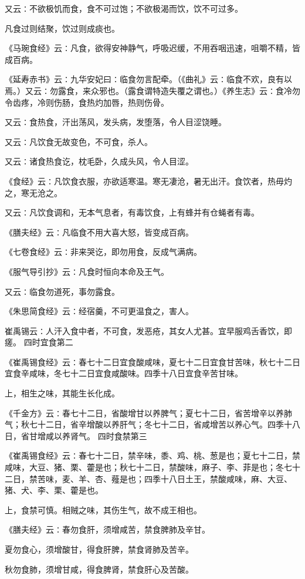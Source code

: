 \documentclass[a4paper,12pt,UTF8,twoside]{ctexbook}
\begin{document}
又云∶不欲极饥而食，食不可过饱；不欲极渴而饮，饮不可过多。

凡食过则结聚，饮过则成痰也。

《马琬食经》云∶凡食，欲得安神静气，呼吸迟缓，不用吞咽迅速，咀嚼不精，皆成百病。

《延寿赤书》云∶九华安妃曰∶临食勿言配牵。（《曲礼》云∶临食不欢，良有以焉。）又云∶勿露食，来众邪也。（露食谓特造失覆之谓也。）《养生志》云∶食冷勿令齿疼，冷则伤肠，食热灼加唇，热则伤骨。

又云∶食热食，汗出荡风，发头病，发堕落，令人目涩饶睡。

又云∶凡饮食无故变色，不可食，杀人。

又云∶诸食热食讫，枕毛卧，久成头风，令人目涩。

《食经》云∶凡饮食衣服，亦欲适寒温。寒无凄沧，暑无出汗。食饮者，热毋灼之，寒无沧之。

又云∶凡饮食调和，无本气息者，有毒饮食，上有蜂并有仓蝇者有毒。

《膳夫经》云∶凡临食不用大喜大怒，皆变成百病。

《七卷食经》云∶非来哭讫，即勿用食，反成气满病。

《服气导引抄》云∶凡食时恒向本命及王气。

又云∶临食勿道死，事勿露食。

《朱思简食经》云∶经宿羹，不可更温食之，害人。

崔禹锡云∶人汗入食中者，不可食，发恶疮，其女人尤甚。宜早服鸡舌香饮，即瘥。
四时宜食第二

《崔禹锡食经》云∶春七十二日宜食酸咸味，夏七十二日宜食甘苦味，秋七十二日宜食辛咸味，冬七十二日宜食咸酸味。四季十八日宜食辛苦甘味。

上，相生之味，其能生长化成。

《千金方》云∶春七十二日，省酸增甘以养脾气；夏七十二日，省苦增辛以养肺气；秋七十二日，省辛增酸以养肝气；冬七十二日，省咸增苦以养心气。四季十八日，省甘增咸以养肾气。
四时食禁第三

《崔禹锡食经》云∶春七十二日，禁辛味，黍、鸡、桃、葱是也；夏七十二日，禁咸味，大豆、猪、栗、藿是也；秋七十二日，禁酸味，麻子、李、菲是也；冬七十二日，禁苦味，麦、羊、杏、薤是也；四季十八日土王，禁酸咸味，麻、大豆、猪、犬、李、栗、藿是也。

上，食禁可慎。相贼之味，其伤生气，故不成王相也。

《膳夫经》云∶春勿食肝，须增咸苦，禁食脾肺及辛甘。

夏勿食心，须增酸甘，得食肝脾，禁食肾肺及苦辛。

秋勿食肺，须增甘咸，得食脾肾，禁食肝心及苦酸。
\end{document}
